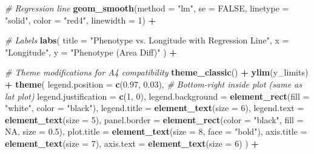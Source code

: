 \documentclass[
  11pt,
]{article}
\newenvironment{Shaded}{\begin{snugshade}}{\end{snugshade}}
\newcommand{\AttributeTok}[1]{\textcolor[rgb]{0.13,0.29,0.53}{#1}}
\newcommand{\CommentTok}[1]{\textcolor[rgb]{0.56,0.35,0.01}{\textit{#1}}}
\newcommand{\ConstantTok}[1]{\textcolor[rgb]{0.56,0.35,0.01}{#1}}
\newcommand{\DecValTok}[1]{\textcolor[rgb]{0.00,0.00,0.81}{#1}}
\newcommand{\FloatTok}[1]{\textcolor[rgb]{0.00,0.00,0.81}{#1}}
\newcommand{\FunctionTok}[1]{\textcolor[rgb]{0.13,0.29,0.53}{\textbf{#1}}}
\newcommand{\NormalTok}[1]{#1}
\newcommand{\SpecialCharTok}[1]{\textcolor[rgb]{0.81,0.36,0.00}{\textbf{#1}}}
\newcommand{\StringTok}[1]{\textcolor[rgb]{0.31,0.60,0.02}{#1}}
\begin{document}
\begin{Shaded}
\begin{Highlighting}[]
  \CommentTok{\# Regression line}
  \FunctionTok{geom\_smooth}\NormalTok{(}\AttributeTok{method =} \StringTok{"lm"}\NormalTok{, }\AttributeTok{se =} \ConstantTok{FALSE}\NormalTok{, }\AttributeTok{linetype =} \StringTok{"solid"}\NormalTok{, }
              \AttributeTok{color =} \StringTok{"red4"}\NormalTok{, }\AttributeTok{linewidth =} \DecValTok{1}\NormalTok{) }\SpecialCharTok{+}
  
  \CommentTok{\# Labels}
  \FunctionTok{labs}\NormalTok{(}
    \AttributeTok{title =} \StringTok{"Phenotype vs. Longitude with Regression Line"}\NormalTok{,}
    \AttributeTok{x =} \StringTok{"Longitude"}\NormalTok{,}
    \AttributeTok{y =} \StringTok{"Phenotype (Area Diff)"}
\NormalTok{  ) }\SpecialCharTok{+}
  
  \CommentTok{\# Theme modifications for A4 compatibility}
  \FunctionTok{theme\_classic}\NormalTok{() }\SpecialCharTok{+}
  \FunctionTok{ylim}\NormalTok{(y\_limits) }\SpecialCharTok{+}
  \FunctionTok{theme}\NormalTok{(}
    \AttributeTok{legend.position =} \FunctionTok{c}\NormalTok{(}\FloatTok{0.97}\NormalTok{, }\FloatTok{0.03}\NormalTok{),  }\CommentTok{\# Bottom{-}right inside plot (same as lat plot)}
    \AttributeTok{legend.justification =} \FunctionTok{c}\NormalTok{(}\DecValTok{1}\NormalTok{, }\DecValTok{0}\NormalTok{),  }
    \AttributeTok{legend.background =} \FunctionTok{element\_rect}\NormalTok{(}\AttributeTok{fill =} \StringTok{"white"}\NormalTok{, }\AttributeTok{color =} \StringTok{"black"}\NormalTok{),}
    \AttributeTok{legend.title =} \FunctionTok{element\_text}\NormalTok{(}\AttributeTok{size =} \DecValTok{6}\NormalTok{),}
    \AttributeTok{legend.text =} \FunctionTok{element\_text}\NormalTok{(}\AttributeTok{size =} \DecValTok{5}\NormalTok{),}
    \AttributeTok{panel.border =} \FunctionTok{element\_rect}\NormalTok{(}\AttributeTok{color =} \StringTok{"black"}\NormalTok{, }\AttributeTok{fill =} \ConstantTok{NA}\NormalTok{, }\AttributeTok{size =} \FloatTok{0.5}\NormalTok{),}
    \AttributeTok{plot.title =} \FunctionTok{element\_text}\NormalTok{(}\AttributeTok{size =} \DecValTok{8}\NormalTok{, }\AttributeTok{face =} \StringTok{"bold"}\NormalTok{),}
    \AttributeTok{axis.title =} \FunctionTok{element\_text}\NormalTok{(}\AttributeTok{size =} \DecValTok{7}\NormalTok{),}
    \AttributeTok{axis.text =} \FunctionTok{element\_text}\NormalTok{(}\AttributeTok{size =} \DecValTok{6}\NormalTok{)}
\NormalTok{  ) }\SpecialCharTok{+}
  

\end{Highlighting}
\end{Shaded}
\end{document}
